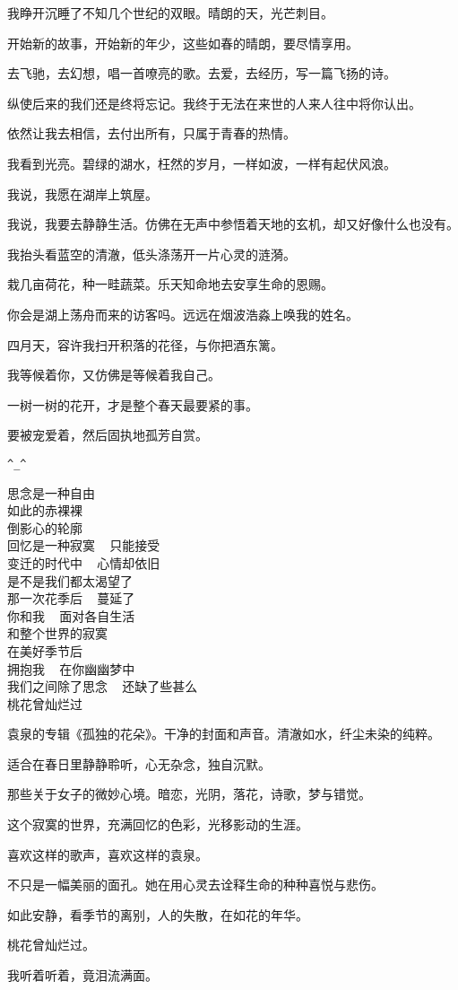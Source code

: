 \documentclass[12pt,a4paper]{article}
\begin{document}
		我睁开沉睡了不知几个世纪的双眼。晴朗的天，光芒刺目。\par
		开始新的故事，开始新的年少，这些如春的晴朗，要尽情享用。\par
		去飞驰，去幻想，唱一首嘹亮的歌。去爱，去经历，写一篇飞扬的诗。\par
		纵使后来的我们还是终将忘记。我终于无法在来世的人来人往中将你认出。\par
		依然让我去相信，去付出所有，只属于青春的热情。\par
		我看到光亮。碧绿的湖水，枉然的岁月，一样如波，一样有起伏风浪。\par
		我说，我愿在湖岸上筑屋。\par
		我说，我要去静静生活。仿佛在无声中参悟着天地的玄机，却又好像什么也没有。\par
		我抬头看蓝空的清澈，低头涤荡开一片心灵的涟漪。\par
		栽几亩荷花，种一畦蔬菜。乐天知命地去安享生命的恩赐。\par
		你会是湖上荡舟而来的访客吗。远远在烟波浩淼上唤我的姓名。\par
		四月天，容许我扫开积落的花径，与你把酒东篱。\par
		我等候着你，又仿佛是等候着我自己。\par
		一树一树的花开，才是整个春天最要紧的事。\par
		要被宠爱着，然后固执地孤芳自赏。

		\verb|^_^|

	\endwriting



		\longpoem{}{}{}
		思念是一种自由 \\
		如此的赤裸裸 \\
		倒影心的轮廓 \\
		回忆是一种寂寞 ~ 只能接受 \\
		变迁的时代中 ~ 心情却依旧 \\
		是不是我们都太渴望了 \\
		那一次花季后 ~ 蔓延了 \\
		你和我 ~ 面对各自生活 \\
		和整个世界的寂寞 \\
		在美好季节后 \\
		拥抱我 ~ 在你幽幽梦中 \\
		我们之间除了思念 ~ 还缺了些甚么 \\
		桃花曾灿烂过
		\endlongpoem

		袁泉的专辑《孤独的花朵》。干净的封面和声音。清澈如水，纤尘未染的纯粹。\par
		适合在春日里静静聆听，心无杂念，独自沉默。\par
		那些关于女子的微妙心境。暗恋，光阴，落花，诗歌，梦与错觉。\par
		这个寂寞的世界，充满回忆的色彩，光移影动的生涯。\par
		喜欢这样的歌声，喜欢这样的袁泉。\par
		不只是一幅美丽的面孔。她在用心灵去诠释生命的种种喜悦与悲伤。\par
		如此安静，看季节的离别，人的失散，在如花的年华。\par
		桃花曾灿烂过。\par
		我听着听着，竟泪流满面。
\end{document}
